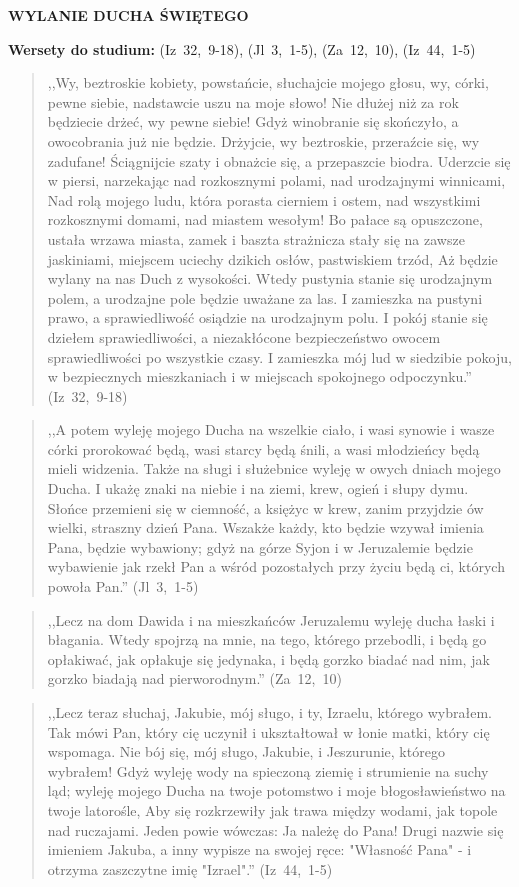 \documentclass[10pt,a4paper,oneside]{article}
\begin{document}
\centerline{\textbf{\MakeUppercase{Wylanie Ducha Świętego}}}
\begin{center}
\textbf{Wersety do studium:} \mbox{(Iz 32, 9-18)}, \mbox{(Jl 3, 1-5)}, \mbox{(Za 12, 10)}, \mbox{(Iz 44, 1-5)}
\end{center}
\begin{quote}
,,Wy, beztroskie kobiety, powstańcie, słuchajcie mojego głosu, wy, córki, pewne siebie, nadstawcie uszu na moje słowo! Nie dłużej niż za rok będziecie drżeć, wy pewne siebie! Gdyż winobranie się skończyło, a owocobrania już nie będzie. Drżyjcie, wy beztroskie, przeraźcie się, wy zadufane! Ściągnijcie szaty i obnażcie się, a przepaszcie biodra. Uderzcie się w piersi, narzekając nad rozkosznymi polami, nad urodzajnymi winnicami, Nad rolą mojego ludu, która porasta cierniem i ostem, nad wszystkimi rozkosznymi domami, nad miastem wesołym! Bo pałace są opuszczone, ustała wrzawa miasta, zamek i baszta strażnicza stały się na zawsze jaskiniami, miejscem uciechy dzikich osłów, pastwiskiem trzód, Aż będzie wylany na nas Duch z wysokości. Wtedy pustynia stanie się urodzajnym polem, a urodzajne pole będzie uważane za las. I zamieszka na pustyni prawo, a sprawiedliwość osiądzie na urodzajnym polu. I pokój stanie się dziełem sprawiedliwości, a niezakłócone bezpieczeństwo owocem sprawiedliwości po wszystkie czasy. I zamieszka mój lud w siedzibie pokoju, w bezpiecznych mieszkaniach i w miejscach spokojnego odpoczynku.'' \mbox{(Iz 32, 9-18)}
\end{quote}
\begin{quote}
,,A potem wyleję mojego Ducha na wszelkie ciało, i wasi synowie i wasze córki prorokować będą, wasi starcy będą śnili, a wasi młodzieńcy będą mieli widzenia. Także na sługi i służebnice wyleję w owych dniach mojego Ducha. I ukażę znaki na niebie i na ziemi, krew, ogień i słupy dymu. Słońce przemieni się w ciemność, a księżyc w krew, zanim przyjdzie ów wielki, straszny dzień Pana. Wszakże każdy, kto będzie wzywał imienia Pana, będzie wybawiony; gdyż na górze Syjon i w Jeruzalemie będzie wybawienie jak rzekł Pan a wśród pozostałych przy życiu będą ci, których powoła Pan.'' \mbox{(Jl 3, 1-5)}
\end{quote}
\begin{quote}
,,Lecz na dom Dawida i na mieszkańców Jeruzalemu wyleję ducha łaski i błagania. Wtedy spojrzą na mnie, na tego, którego przebodli, i będą go opłakiwać, jak opłakuje się jedynaka, i będą gorzko biadać nad nim, jak gorzko biadają nad pierworodnym.'' \mbox{(Za 12, 10)}
\end{quote}
\begin{quote}
,,Lecz teraz słuchaj, Jakubie, mój sługo, i ty, Izraelu, którego wybrałem. Tak mówi Pan, który cię uczynił i ukształtował w łonie matki, który cię wspomaga. Nie bój się, mój sługo, Jakubie, i Jeszurunie, którego wybrałem! Gdyż wyleję wody na spieczoną ziemię i strumienie na suchy ląd; wyleję mojego Ducha na twoje potomstwo i moje błogosławieństwo na twoje latorośle, Aby się rozkrzewiły jak trawa między wodami, jak topole nad ruczajami. Jeden powie wówczas: Ja należę do Pana! Drugi nazwie się imieniem Jakuba, a inny wypisze na swojej ręce: "Własność Pana" - i otrzyma zaszczytne imię "Izrael".'' \mbox{(Iz 44, 1-5)}
\end{quote}
\end{document}
